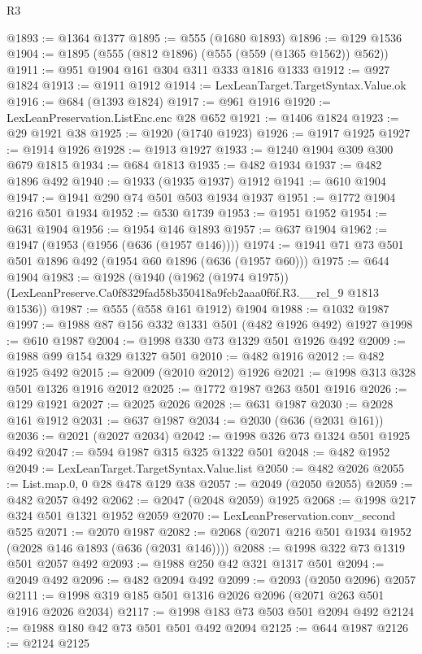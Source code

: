 \begin{lexlean}{R3}
\begin{coremodule}
@1893 := @1364 @1377
@1895 := @555 (@1680 @1893)
@1896 := @129 @1536
@1904 := @1895 (@555 (@812 @1896) (@555 (@559 (@1365 @1562)) @562))
@1911 := @951 @1904 @161 @304 @311 @333 @1816 @1333
@1912 := @927 @1824
@1913 := @1911 @1912
@1914 := LexLeanTarget.TargetSyntax.Value.ok
@1916 := @684 (@1393 @1824)
@1917 := @961 @1916
@1920 := LexLeanPreservation.ListEnc.enc @28 @652
@1921 := @1406 @1824
@1923 := @29 @1921 @38
@1925 := @1920 (@1740 @1923)
@1926 := @1917 @1925
@1927 := @1914 @1926
@1928 := @1913 @1927
@1933 := @1240 @1904 @309 @300 @679 @1815
@1934 := @684 @1813
@1935 := @482 @1934
@1937 := @482 @1896 @492
@1940 := @1933 (@1935 @1937) @1912
@1941 := @610 @1904
@1947 := @1941 @290 @74 @501 @503 @1934 @1937
@1951 := @1772 @1904 @216 @501 @1934
@1952 := @530 @1739
@1953 := @1951 @1952
@1954 := @631 @1904
@1956 := @1954 @146 @1893
@1957 := @637 @1904
@1962 := @1947 (@1953 (@1956 (@636 (@1957 @146))))
@1974 := @1941 @71 @73 @501 @501 @1896 @492 (@1954 @60 @1896 (@636 (@1957 @60)))
@1975 := @644 @1904
@1983 := @1928
    (@1940
      (@1962 (@1974 @1975))
      (LexLeanPreserve.Ca0f8329fad58b350418a9fcb2aaa0f6f.R3.__rel_9 @1813 @1536))
@1987 := @555 (@558 @161 @1912) @1904
@1988 := @1032 @1987
@1997 := @1988 @87 @156 @332 @1331 @501 (@482 @1926 @492) @1927
@1998 := @610 @1987
@2004 := @1998 @330 @73 @1329 @501 @1926 @492
@2009 := @1988 @99 @154 @329 @1327 @501
@2010 := @482 @1916
@2012 := @482 @1925 @492
@2015 := @2009 (@2010 @2012) @1926
@2021 := @1998 @313 @328 @501 @1326 @1916 @2012
@2025 := @1772 @1987 @263 @501 @1916
@2026 := @129 @1921
@2027 := @2025 @2026
@2028 := @631 @1987
@2030 := @2028 @161 @1912
@2031 := @637 @1987
@2034 := @2030 (@636 (@2031 @161))
@2036 := @2021 (@2027 @2034)
@2042 := @1998 @326 @73 @1324 @501 @1925 @492
@2047 := @594 @1987 @315 @325 @1322 @501
@2048 := @482 @1952
@2049 := LexLeanTarget.TargetSyntax.Value.list
@2050 := @482 @2026
@2055 := List.map.{0, 0} @28 @478 @129 @38
@2057 := @2049 (@2050 @2055)
@2059 := @482 @2057 @492
@2062 := @2047 (@2048 @2059) @1925
@2068 := @1998 @217 @324 @501 @1321 @1952 @2059
@2070 := LexLeanPreservation.conv_second @525
@2071 := @2070 @1987
@2082 := @2068 (@2071 @216 @501 @1934 @1952 (@2028 @146 @1893 (@636 (@2031 @146))))
@2088 := @1998 @322 @73 @1319 @501 @2057 @492
@2093 := @1988 @250 @42 @321 @1317 @501
@2094 := @2049 @492
@2096 := @482 @2094 @492
@2099 := @2093 (@2050 @2096) @2057
@2111 := @1998 @319 @185 @501 @1316 @2026 @2096 (@2071 @263 @501 @1916 @2026 @2034)
@2117 := @1998 @183 @73 @503 @501 @2094 @492
@2124 := @1988 @180 @42 @73 @501 @501 @492 @2094
@2125 := @644 @1987
@2126 := @2124 @2125

\end{coremodule}
\end{lexlean}
